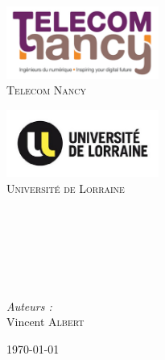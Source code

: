 \begin{titlepage}

\begin{center}

\begin{minipage}[t]{0.48\textwidth}
  \begin{flushleft}
	\includegraphics [width=50mm]{images/logo-telecom.png} \\[0.5cm]
      \textsc{\LARGE Telecom Nancy}
  \end{flushleft}
\end{minipage}
\begin{minipage}[t]{0.48\textwidth}
  \begin{flushright}
    \includegraphics [width=50mm]{images/logo-ul.jpg} \\[0.5cm]
    \textsc{\LARGE Université de Lorraine}
  \end{flushright}
\end{minipage} \\[1.5cm]


	\textsc{\Large \reportsubject}\\[0.5cm]
	\HRule \\[0.4cm]
	{\huge \bfseries \reporttitle}\\[0.4cm]
	\HRule \\[1.5cm]
	
	\begin{minipage}[t]{0.3\textwidth}
 	 	\begin{flushleft} \large
  		\end{flushleft}
	\end{minipage}
	\begin{minipage}[t]{0.6\textwidth}
  		\begin{flushright} \large
    		\emph{Auteurs :} \\
    		Vincent \textsc{Albert} \\
  		\end{flushright}
	\end{minipage}

\vfill

{\large \today{}}

\end{center}

\end{titlepage}
